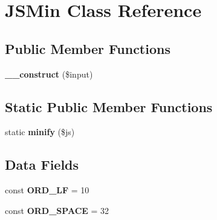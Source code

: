 \hypertarget{class_j_s_min}{
\section{JSMin Class Reference}
\label{class_j_s_min}
}
\subsection*{Public Member Functions}
\begin{DoxyCompactItemize}
\item 
\hypertarget{class_j_s_min_ade22206ffe41068eed8c5a35952f7543}{
{\bfseries \_\-\_\-construct} (\$input)}
\label{class_j_s_min_ade22206ffe41068eed8c5a35952f7543}

\end{DoxyCompactItemize}
\subsection*{Static Public Member Functions}
\begin{DoxyCompactItemize}
\item 
\hypertarget{class_j_s_min_a3a83b0020e30f40e82dcf9ab4c24c822}{
static {\bfseries minify} (\$js)}
\label{class_j_s_min_a3a83b0020e30f40e82dcf9ab4c24c822}

\end{DoxyCompactItemize}
\subsection*{Data Fields}
\begin{DoxyCompactItemize}
\item 
\hypertarget{class_j_s_min_a98f6ca84ead290a98d78d5af97f3b0b3}{
const {\bfseries ORD\_\-LF} = 10}
\label{class_j_s_min_a98f6ca84ead290a98d78d5af97f3b0b3}

\item 
\hypertarget{class_j_s_min_ae1d4e1296e34ef6f2ca1afd327ec3d9c}{
const {\bfseries ORD\_\-SPACE} = 32}
\label{class_j_s_min_ae1d4e1296e34ef6f2ca1afd327ec3d9c}

\end{DoxyCompactItemize}
